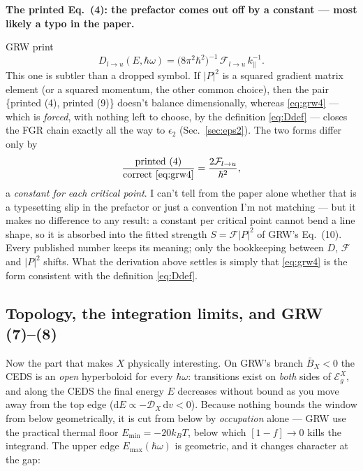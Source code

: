 \documentclass[11pt,a4paper]{article}
\newenvironment{printfix}[1]{%
  \begin{mdframed}[style=printfixstyle]%
  \noindent\textbf{\textcolor{BrickRed}{#1}}\par\smallskip\noindent\ignorespaces}%
  {\end{mdframed}}
\numberwithin{equation}{section}
\newcommand{\hw}{\hbar\omega}
\newcommand{\EgX}{\mathcal{E}_g^{X}}
\newcommand{\cD}{\mathcal{D}}
\newcommand{\cF}{\mathcal{F}}
\newcommand{\BX}{\bar{B}_X}
\newcommand{\kpar}{k_{\parallel}}
\newcommand{\dd}{\mathrm{d}}
\begin{document}
\begin{printfix}{The printed Eq.~(4): the prefactor comes out off by a
constant --- most likely a typo in the paper.}
GRW print
\begin{equation*}
D_{l\to u}(E,\hw)=\bigl(8\pi^2\hbar^2\bigr)^{-1}\,
\cF_{l\to u}\,\kpar^{-1}. \tag{4, as printed}
\end{equation*}
This one is subtler than a dropped symbol. If $|P|^2$ is a squared
gradient matrix element (or a squared momentum, the other common
choice), then the pair \{printed (4), printed (9)\} doesn't balance
dimensionally, whereas \eqref{eq:grw4} --- which is \emph{forced},
with nothing left to choose, by the definition \eqref{eq:Ddef} ---
closes the FGR chain exactly all the way to $\epsilon_2$
(Sec.~\ref{sec:eps2}). The two forms differ only by
\[
\frac{\text{printed (4)}}{\text{correct }\eqref{eq:grw4}}
=\frac{2\cF_{l\to u}}{\hbar^2},
\]
a \emph{constant for each critical point}. I can't tell from the paper
alone whether that is a typesetting slip in the prefactor or just a
convention I'm not matching --- but it makes no difference to any
result: a constant per critical point cannot bend a line shape, so it
is absorbed into the fitted strength $S=\cF|P|^2$ of GRW's Eq.~(10).
Every published number keeps its meaning; only the bookkeeping between
$D$, $\cF$ and $|P|^2$ shifts. What the derivation above settles is
simply that \eqref{eq:grw4} is the form consistent with the definition
\eqref{eq:Ddef}.
\end{printfix}

\subsection{Topology, the integration limits, and GRW (7)--(8)}
\label{sec:Xtopology}

Now the part that makes $X$ physically interesting. On GRW's branch
$\BX<0$ the CEDS is an \emph{open} hyperboloid for every $\hw$:
transitions exist on \emph{both} sides of $\EgX$, and along the CEDS
the final energy $E$ decreases without bound as you move away from the
top edge ($\dd E\propto-\cD_X\,\dd v<0$). Because nothing bounds the
window from below geometrically, it is cut from below by
\emph{occupation} alone --- GRW use the practical thermal floor
$E_{\min}=-20k_BT$, below which $[1-f]\to0$ kills the integrand. The
upper edge $E_{\max}(\hw)$ is geometric, and it changes character at
the gap:
\end{document}
